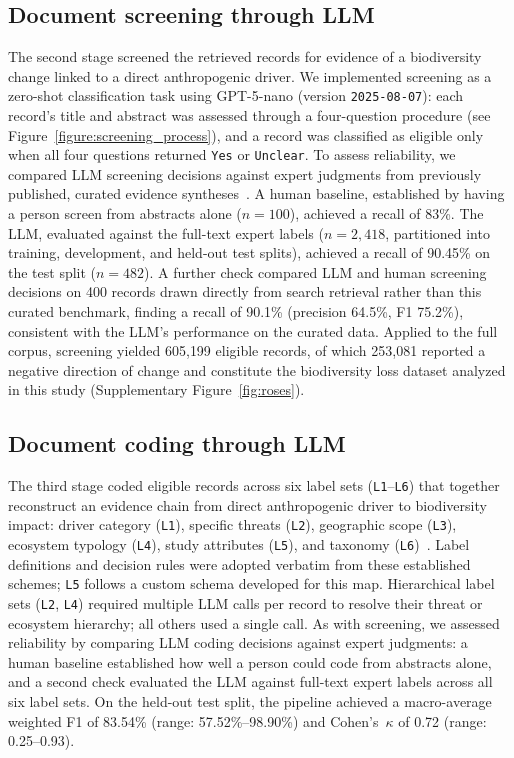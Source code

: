 \documentclass[12pt]{article}
\begin{document}
\subsection*{Document screening through LLM}
The second stage screened the retrieved records for evidence of a biodiversity change linked to a direct anthropogenic driver. We implemented screening as a zero-shot classification task using GPT-5-nano (version \texttt{2025-08-07}): each record's title and abstract was assessed through a four-question procedure (see Figure~\ref{figure:screening_process}), and a record was classified as eligible only when all four questions returned \texttt{Yes} or \texttt{Unclear}. To assess reliability, we compared LLM screening decisions against expert judgments from previously published, curated evidence syntheses~\cite{shawetal, kecketal, murphyetal, jaureguiberry_direct_2022, iucn_rle_2022}. A human baseline, established by having a person screen from abstracts alone ($n = 100$), achieved a recall of 83\%. The LLM, evaluated against the full-text expert labels ($n = 2{,}418$, partitioned into training, development, and held-out test splits), achieved a recall of 90.45\% on the test split ($n = 482$). A further check compared LLM and human screening decisions on 400 records drawn directly from search retrieval rather than this curated benchmark, finding a recall of 90.1\% (precision 64.5\%, F1 75.2\%), consistent with the LLM's performance on the curated data. Applied to the full corpus, screening yielded 605{,}199 eligible records, of which 253{,}081 reported a negative direction of change and constitute the biodiversity loss dataset analyzed in this study (Supplementary Figure~\ref{fig:roses}).

\subsection*{Document coding through LLM}
The third stage coded eligible records across six label sets (\texttt{L1}--\texttt{L6}) that together reconstruct an evidence chain from direct anthropogenic driver to biodiversity impact: driver category (\texttt{L1}), specific threats (\texttt{L2}), geographic scope (\texttt{L3}), ecosystem typology (\texttt{L4}), study attributes (\texttt{L5}), and taxonomy (\texttt{L6})~\cite{diaz_ipbes_2015, iucn_threats_classification_2022, data_ipbes_geo, keith2022function_get, GBIFBackboneTaxonomy_general}. Label definitions and decision rules were adopted verbatim from these established schemes; \texttt{L5} follows a custom schema developed for this map. Hierarchical label sets (\texttt{L2}, \texttt{L4}) required multiple LLM calls per record to resolve their threat or ecosystem hierarchy; all others used a single call. As with screening, we assessed reliability by comparing LLM coding decisions against expert judgments: a human baseline established how well a person could code from abstracts alone, and a second check evaluated the LLM against full-text expert labels across all six label sets. On the held-out test split, the pipeline achieved a macro-average weighted F1 of 83.54\% (range: 57.52\%--98.90\%) and Cohen's~$\kappa$ of 0.72 (range: 0.25--0.93).
\end{document}
